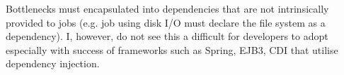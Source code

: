 \documentclass[conference]{ieee/IEEEtran}
\begin{document}
Bottlenecks must encapsulated into dependencies that are not intrinsically
provided to jobs (e.g. job using disk I/O must declare the file system as a
dependency).  I, however, do not see this a difficult for developers to adopt
especially with success of frameworks such as Spring, EJB3, CDI that utilise
dependency injection.



%
%



%
%
\end{document}
